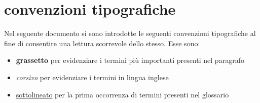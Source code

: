 %
%
\section[Convenzioni tipografiche]{convenzioni tipografiche}
\label{abs-hightlighting}
Nel seguente documento si sono introdotte le seguenti convenzioni tipografiche al fine di consentire una lettura scorrevole dello stesso. Esse sono:

\begin{itemize}
\item{\textbf{grassetto} per evidenziare i termini più importanti presenti nel paragrafo}
\item{\textit{corsivo} per evidenziare i termini in lingua inglese}
\item{\underline{sottolineato} per la prima occorrenza di termini presenti nel glossario}
\end{itemize}